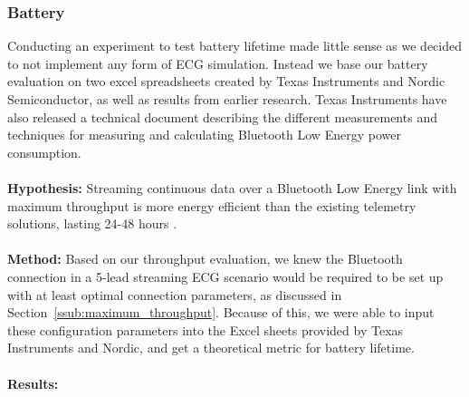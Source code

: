 
\subsubsection{Battery} %
\label{ssub:battery}

Conducting an experiment to test battery lifetime made little sense as we decided to not implement any form of ECG simulation. Instead we base our battery evaluation on two excel spreadsheets created by Texas Instruments and Nordic Semiconductor, as well as results from earlier research. Texas Instruments have also released a technical document \cite{TIbatteryCalculations} describing the different measurements and techniques for measuring and calculating Bluetooth Low Energy power consumption.
\\
\\
\noindent %
\textbf{Hypothesis:} Streaming continuous data over a Bluetooth Low Energy link with maximum throughput is more energy efficient than the existing telemetry solutions, lasting 24-48 hours \cite{philipsIntellivueTrancievers}.
\\
\\
\noindent
\textbf{Method:} Based on our throughput evaluation, we knew the Bluetooth connection in a 5-lead streaming ECG scenario would be required to be set up with at least optimal connection parameters, as discussed in Section~\ref{ssub:maximum_throughput}. Because of this, we were able to input these configuration parameters into the Excel sheets provided by Texas Instruments and Nordic, and get a theoretical metric for battery lifetime.
\\
\\
\noindent
\textbf{Results:} 
